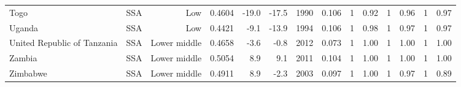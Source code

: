 \begin{longtable}{llrrrrrrrrrrrr}
Togo & SSA & Low & 0.4604 & -19.0 & -17.5 & 1990 & 0.106 & 1 & 0.92 & 1 & 0.96 & 1 & 0.97 \\
Uganda & SSA & Low & 0.4421 &  -9.1 & -13.9 & 1994 & 0.106 & 1 & 0.98 & 1 & 0.97 & 1 & 0.97 \\
United Republic of Tanzania & SSA & Lower middle & 0.4658 &  -3.6 &  -0.8 & 2012 & 0.073 & 1 & 1.00 & 1 & 1.00 & 1 & 1.00 \\
Zambia & SSA & Lower middle & 0.5054 &   8.9 &   9.1 & 2011 & 0.104 & 1 & 1.00 & 1 & 1.00 & 1 & 1.00 \\
Zimbabwe & SSA & Lower middle & 0.4911 &   8.9 &  -2.3 & 2003 & 0.097 & 1 & 1.00 & 1 & 0.97 & 1 & 0.89 \\
\end{longtable}
